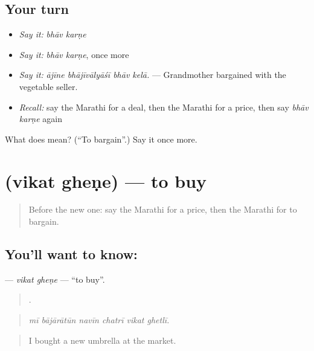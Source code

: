 \subsection*{Your turn}
\begin{itemize}
\raggedright
  \item \emph{Say it:} \emph{bhāv karṇe}
  \item \emph{Say it:} \emph{bhāv karṇe}, once more
  \item \emph{Say it:} \emph{ājīne bhājīvālyāśī bhāv kelā.} — Grandmother bargained with the vegetable seller.
  \item \emph{Recall:} say the Marathi for a deal, then the Marathi for a price, then say \emph{bhāv karṇe} again
\end{itemize}

\begin{tcolorbox}[breakable,colback=teal!4,colframe=teal!35!black,title={Before you move on}]
What does   mean? (\textquotedblleft{}To bargain\textquotedblright{}.) Say it once more.
\end{tcolorbox}
\section[\texorpdfstring{\mr{विकत} \mr{घेणे} (vikat gheṇe)}{विकत घेणे (vikat gheṇe)}]{  (vikat gheṇe) — to buy}

\label{lesson:MR-C423-vikat-ghene}



\begin{quote}
Before the new one: say the Marathi for a price, then the Marathi for to bargain.
\end{quote}

\subsection*{You'll want to know:  }
\textbf{ } — \emph{vikat gheṇe} — \textquotedblleft{}to buy\textquotedblright{}.

\begin{quote}
     .
\end{quote}

\begin{quote}
\emph{mī bājārātūn navīn chatrī vikat ghetlī.}
\end{quote}

\begin{quote}
I bought a new umbrella at the market.
\end{quote}


